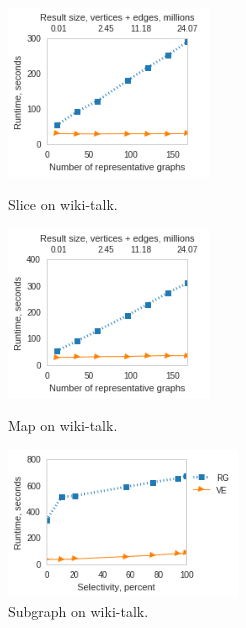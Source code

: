 \begin{figure}
\begin{minipage}[b]{2.2in}
\centering
\includegraphics[width=2.1in]{figs/slice_wikitalk_build13.png}
\caption{Slice on wiki-talk.}
\label{fig:slicewiki}
\end{minipage}
\begin{minipage}[b]{2.2in}
\centering
\includegraphics[width=2.1in]{figs/project_wikitalk_build13.png}
\caption{Map on wiki-talk.}
\label{fig:project}
\end{minipage}
\begin{minipage}[b]{2.2in}
\centering
\includegraphics[width=2.4in]{figs/subgraph_wikitalk_build13.png}
\caption{Subgraph on wiki-talk.}
\label{fig:subgraphwiki}
\end{minipage}
\end{figure}

